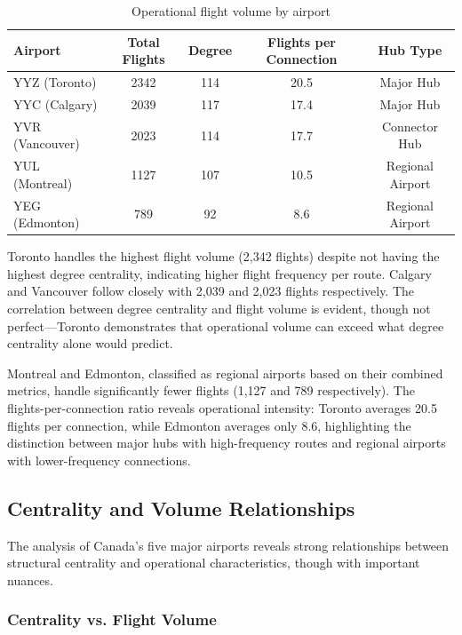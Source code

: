 \documentclass[10pt]{article}
\begin{document}
\begin{table}[h!]
    \centering
    \caption{Operational flight volume by airport}
    \begin{tabular}{lcccc}
        \toprule
        Airport & Total Flights & Degree & Flights per Connection & Hub Type \\
        \midrule
        YYZ (Toronto)   & 2342 & 114 & 20.5 & Major Hub \\
        YYC (Calgary)   & 2039 & 117 & 17.4 & Major Hub \\
        YVR (Vancouver) & 2023 & 114 & 17.7 & Connector Hub \\
        YUL (Montreal)  & 1127 & 107 & 10.5 & Regional Airport \\
        YEG (Edmonton)  & 789  & 92  & 8.6  & Regional Airport \\
        \bottomrule
    \end{tabular}
\end{table}

Toronto handles the highest flight volume (2,342 flights) despite not having the highest degree centrality, indicating higher flight frequency per route. Calgary and Vancouver follow closely with 2,039 and 2,023 flights respectively. The correlation between degree centrality and flight volume is evident, though not perfect---Toronto demonstrates that operational volume can exceed what degree centrality alone would predict.

Montreal and Edmonton, classified as regional airports based on their combined metrics, handle significantly fewer flights (1,127 and 789 respectively). The flights-per-connection ratio reveals operational intensity: Toronto averages 20.5 flights per connection, while Edmonton averages only 8.6, highlighting the distinction between major hubs with high-frequency routes and regional airports with lower-frequency connections.

\subsection{Centrality and Volume Relationships}

The analysis of Canada's five major airports reveals strong relationships between structural centrality and operational characteristics, though with important nuances.

\subsubsection{Centrality vs. Flight Volume}
\end{document}
